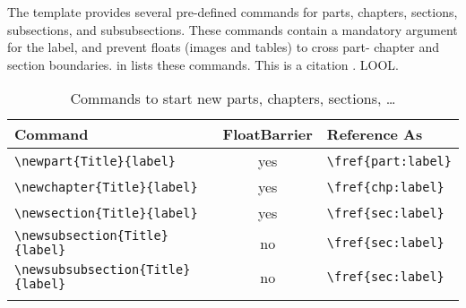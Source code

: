 
The template provides several pre-defined commands for parts, chapters, sections, subsections, and subsubsections. These commands contain a mandatory argument for the label, and prevent floats (images and tables) to cross part- chapter and section boundaries.  in  lists these commands. This is a citation \cite{Mowlaee2016}. LOOL.

\begin{longtable}{l|c|l}
  \textbf{Command} & \textbf{FloatBarrier} & \textbf{Reference As} \\\hline
  \verb|\newpart{Title}{label}| & yes & \verb|\fref{part:label}| \\
  \verb|\newchapter{Title}{label}| & yes & \verb|\fref{chp:label}| \\
  \verb|\newsection{Title}{label}| & yes & \verb|\fref{sec:label}| \\
  \verb|\newsubsection{Title}{label}| & no & \verb|\fref{sec:label}| \\
  \verb|\newsubsubsection{Title}{label}| & no & \verb|\fref{sec:label}| \\
  \caption{Commands to start new parts, chapters, sections, \dots}
  \label{tab:intro:sections:commands}
\end{longtable}





